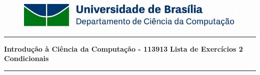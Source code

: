 \documentclass[a4paper, 12pt]{article}
\begin{document}
\begin{figure}[H]
	\includegraphics[scale=0.9]{UnB_CiC_Logo.jpg}
\end{figure}
\noindent\rule{\textwidth}{0.4pt}
\begin{center}
	\textbf{{\Large Introdução à Ciência da Computação - 113913}} \newline \newline
	\textbf{{\large Lista de Exercícios 2} \\
	\vspace{9pt}
	{\large Condicionais}} \\
	\noindent\rule{\textwidth}{0.4pt}
	\newline
\end{center}
\end{document}
